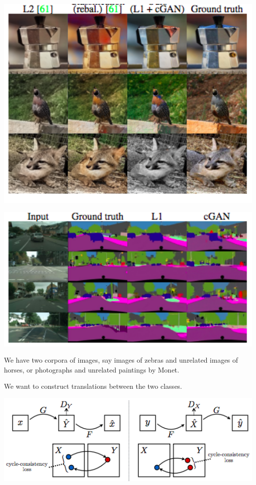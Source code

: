 {

\centerline{\includegraphics[width = 6.0in]{../images/cGAN3}}


\centerline{\includegraphics[width = 8.0in]{../images/cGAN4}}


We have two corpora of images, say images of zebras and unrelated images of horses, or photographs and unrelated paintings by Monet.

\vfill
We want to construct translations between the two classes.

\centerline{\includegraphics[width = 8.0in]{../images/Cycle2}}

}
